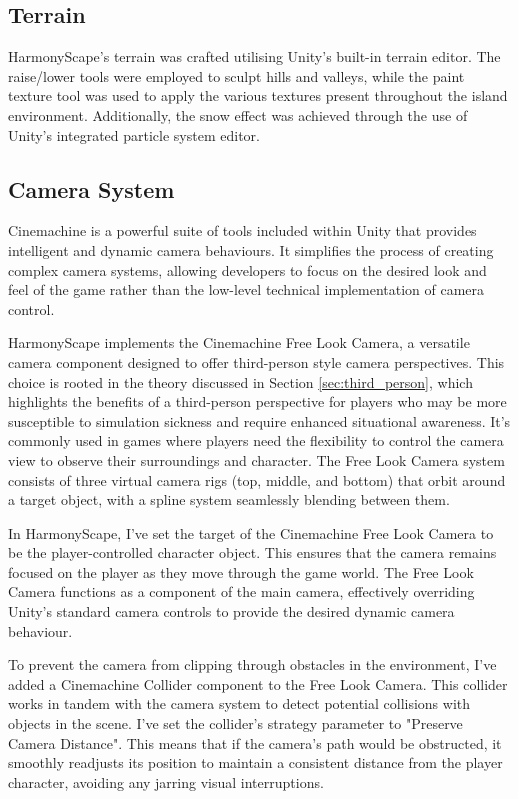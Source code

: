 \documentclass{l4proj}
\begin{document}
\subsection{Terrain}
HarmonyScape's terrain was crafted utilising Unity's built-in terrain editor. The raise/lower tools were employed to sculpt hills and valleys, while the paint texture tool was used to apply the various textures present throughout the island environment.  Additionally, the snow effect was achieved through the use of Unity's integrated particle system editor.

\subsection{Camera System}
Cinemachine is a powerful suite of tools included within Unity that provides intelligent and dynamic camera behaviours. It simplifies the process of creating complex camera systems, allowing developers to focus on the desired look and feel of the game rather than the low-level technical implementation of camera control.

HarmonyScape implements the Cinemachine Free Look Camera, a versatile camera component designed to offer third-person style camera perspectives. This choice is rooted in the theory discussed in Section \ref{sec:third_person}, which highlights the benefits of a third-person perspective for players who may be more susceptible to simulation sickness and require enhanced situational awareness. It's commonly used in games where players need the flexibility to control the camera view to observe their surroundings and character. The Free Look Camera system consists of three virtual camera rigs (top, middle, and bottom) that orbit around a target object, with a spline system seamlessly blending between them.

In HarmonyScape, I've set the target of the Cinemachine Free Look Camera to be the player-controlled character object. This ensures that the camera remains focused on the player as they move through the game world. The Free Look Camera functions as a component of the main camera, effectively overriding Unity's standard camera controls to provide the desired dynamic camera behaviour.

To prevent the camera from clipping through obstacles in the environment, I've added a Cinemachine Collider component to the Free Look Camera. This collider works in tandem with the camera system to detect potential collisions with objects in the scene. I've set the collider's strategy parameter to "Preserve Camera Distance". This means that if the camera's path would be obstructed, it smoothly readjusts its position to maintain a consistent distance from the player character, avoiding any jarring visual interruptions.
\end{document}
